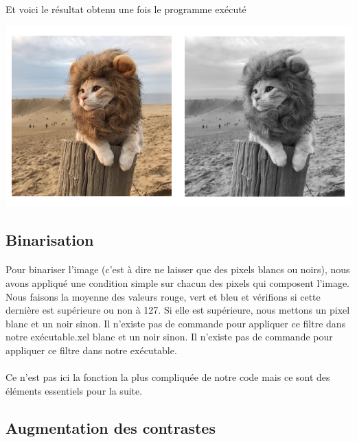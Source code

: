 \documentclass{article}
\begin{document}
\paragraph{}Et voici le résultat obtenu une fois le programme exécuté
\begin{center}
	\includegraphics[scale=0.45]{a}
\end{center}


\subsection{Binarisation}

\paragraph{}Pour binariser l'image (c'est à dire ne laisser que des pixels blancs ou noirs), nous avons appliqué une condition simple sur chacun des pixels qui composent l'image. Nous faisons la moyenne des valeurs rouge, vert et bleu et vérifions si cette dernière est supérieure ou non à 127. Si elle est supérieure, nous mettons un pixel blanc et un noir sinon. Il n'existe pas de commande pour appliquer ce filtre dans notre exécutable.xel blanc et un noir sinon. Il n'existe pas de commande pour appliquer ce filtre dans notre exécutable.
\paragraph{} Ce n'est pas ici la fonction la plus compliquée de notre code mais ce sont des éléments essentiels pour la suite.

\newpage

\subsection{Augmentation des contrastes}
\end{document}
